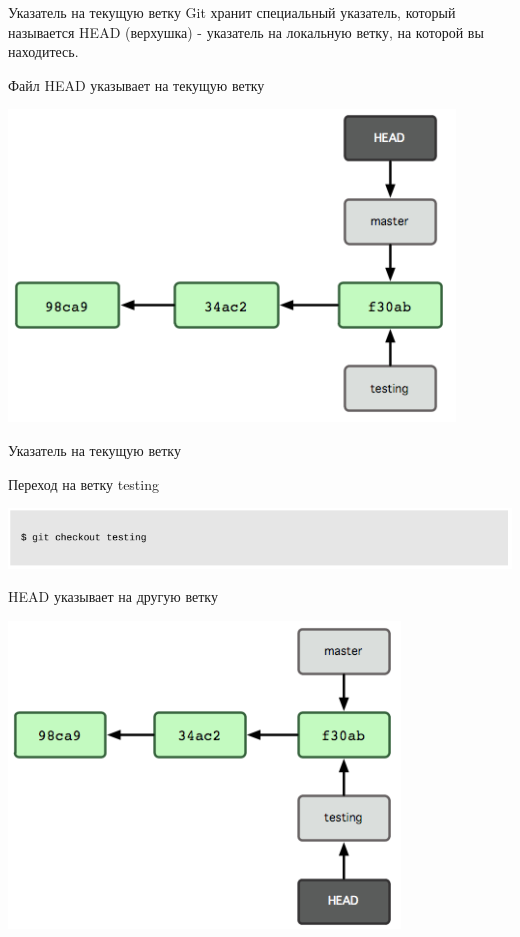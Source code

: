 \documentclass{beamer}
\begin{document}
\begin{frame}{Указатель на текущую ветку}
Git хранит специальный указатель, который называется HEAD (верхушка) - указатель на локальную ветку, на которой вы находитесь. 
\begin{block}{Файл HEAD указывает на текущую ветку}
\begin{center}
\includegraphics[scale=0.6]{images/branch-07.png}
\end{center}
\end{block}
\end{frame}

\begin{frame}{Указатель на текущую ветку}
\begin{block}{Переход на ветку testing}
\begin{center}
\includegraphics[scale=0.5]{images/branch-08.png}
\end{center}
\end{block}
\begin{block}{HEAD указывает на другую ветку}
\begin{center}
\includegraphics[scale=0.5]{images/branch-09.png}
\end{center}
\end{block}
\end{frame}
\end{document}
